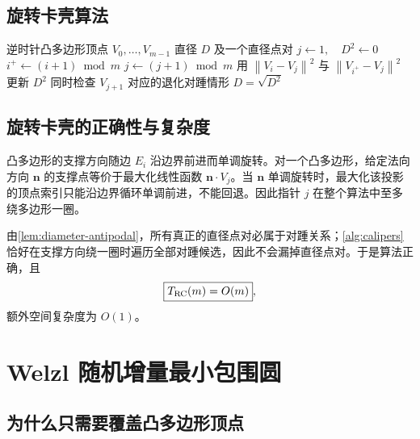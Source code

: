 \documentclass[UTF8,12pt,a4paper]{ctexart}
\theoremstyle{definition}
\newcommand{\norm}[1]{\left\lVert #1\right\rVert}
\begin{document}
\subsection{旋转卡壳算法}

\begin{algorithm}[htbp]
\caption{旋转卡壳求凸多边形直径}
\label{alg:calipers}
\begin{algorithmic}[1]
\Require 逆时针凸多边形顶点 $V_0,\ldots,V_{m-1}$
\Ensure 直径 $D$ 及一个直径点对
\State $j\gets1,\quad D^2\gets0$
    \State $i^+\gets(i+1)\bmod m$
        \State $j\gets(j+1)\bmod m$
    \EndWhile
    \State 用 $\norm{V_i-V_j}^2$ 与 $\norm{V_{i^+}-V_j}^2$ 更新 $D^2$
        \State 同时检查 $V_{j+1}$ 对应的退化对踵情形
    \EndIf
\EndFor
\State \Return $D=\sqrt{D^2}$
\end{algorithmic}
\end{algorithm}

\subsection{旋转卡壳的正确性与复杂度}

凸多边形的支撑方向随边 $E_i$ 沿边界前进而单调旋转。对一个凸多边形，给定法向方向 $\bm n$ 的支撑点等价于最大化线性函数 $\bm n\cdot V_j$。当 $\bm n$ 单调旋转时，最大化该投影的顶点索引只能沿边界循环单调前进，不能回退。因此指针 $j$ 在整个算法中至多绕多边形一圈。

由\cref{lem:diameter-antipodal}，所有真正的直径点对必属于对踵关系；\cref{alg:calipers} 恰好在支撑方向绕一圈时遍历全部对踵候选，因此不会漏掉直径点对。于是算法正确，且
\begin{equation}
\boxed{T_{\rm RC}(m)=O(m)},
\end{equation}
额外空间复杂度为 $O(1)$。

\section{Welzl 随机增量最小包围圆}

\subsection{为什么只需要覆盖凸多边形顶点}
\end{document}
